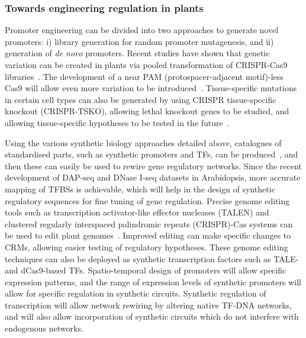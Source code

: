 \documentclass[../main.tex]{subfiles}
\begin{document}
\subsubsection{Towards engineering regulation in plants}\label{chapter1:towards-engineering-regulation-in-plants}
Promoter engineering can be divided into two approaches to generate novel promoters: i) library generation for random promoter mutagenesis, and ii) generation of \textit{de novo} promoters.
Recent studies have shown that genetic variation can be created in plants via pooled transformation of CRISPR-Cas9 libraries~\autocite{jacobsGenerationCollectionMutant2017,luGenomewideTargetedMutagenesis2017,mengConstructionGenomeWideMutant2017,jacobsGenerationCollectionMutant2017,baiGenerationMultiplexMutagenesis2020}. The development of a near PAM (protospacer\hyp{}adjacent motif)\hyp{}less Cas9 will allow even more variation to be introduced~\autocite{waltonUnconstrainedGenomeTargeting2020}. Tissue\hyp{}specific mutations in certain cell types can also be generated by using CRISPR tissue-specific knockout (CRISPR-TSKO), allowing lethal knockout genes to be studied, and allowing tissue-specific hypotheses to be tested in the future~\autocite{decaesteckerCRISPRTSKOTechniqueEfficient2019}.

Using the various synthetic biology approaches detailed above, catalogues of standardised parts, such as synthetic promoters and TFs, can be produced~\autocite{patronStandardsPlantSynthetic2015}, and then these can easily be used to rewire gene regulatory networks.
Since the recent development of DAP\hyp{}seq and DNase I\hyp{}seq datasets in Arabidopsis, more accurate mapping of TFBSs is achievable, which will help in the design of synthetic regulatory sequences for fine tuning of gene regulation.
Precise genome editing tools such as transcription activator-like effector nucleases (TALEN) and clustered regularly interspaced palindromic repeats (CRISPR)-Cas systems can be used to edit plant genomes~\autocite{malzahnPlantGenomeEditing2017}.
Improved editing can make specific changes to CRMs, allowing easier testing of regulatory hypotheses.
These genome editing techniques can also be deployed as synthetic transcription factors such as TALE- and dCas9\hyp{}based TFs.
Spatio\hyp{}temporal design of promoters will allow specific expression patterns, and the range of expression levels of synthetic promoters will allow for specific regulation in synthetic circuits.
Synthetic regulation of transcription will allow network rewiring by altering native TF\hyp{}DNA networks, and will also allow incorporation of synthetic circuits which do not interfere with endogenous networks.
\end{document}

